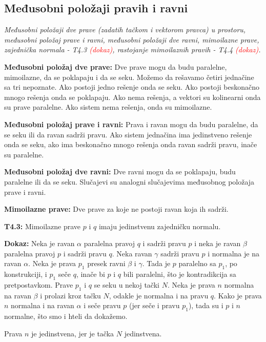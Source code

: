 \documentclass[12pt]{article}
\newcommand{\ocena}[1]{\textcolor{red}{#1}}
\begin{document}
\subsection{Međusobni položaji pravih i ravni}
\label{subsec:pitanje_16}
\textit{Međusobni položaji dve prave (zadatih tačkom i vektorom pravca) u
    prostoru, međusobni položaj prave i ravni, međusobni položaji dve ravni,
    mimoilazne prave, zajednička normala - T4.3 \ocena{(dokaz)}, rastojanje mimoilaznih
    pravih - T4.4 \ocena{(dokaz)}.}
\par
\vspace*{1cm}

\textbf{Međusobni položaj dve prave:} Dve prave mogu da budu paralelne,
mimoilazne, da se poklapaju i da se seku. Možemo da rešavamo četiri jednačine sa
tri nepoznate. Ako postoji jedno rešenje onda se seku. Ako postoji beskonačno
mnogo rešenja onda se poklapaju. Ako nema rešenja, a vektori su kolinearni onda
su prave paralelne. Ako sistem nema rešenja, onda su mimoilazne.
\par

\textbf{Međusobni položaj prave i ravni:} Prava i ravan mogu da budu paralelne,
da se seku ili da ravan sadrži pravu. Ako sistem jednačina ima jedinstveno
rešenje onda se seku, ako ima beskonačno mnogo rešenja onda ravan sadrži pravu,
inače su paralelne.
\par

\textbf{Međusobni položaj dve ravni:} Dve ravni mogu da se poklapaju, budu
paralelne ili da se seku. Slučajevi su analogni slučajevima međusobnog položaja
prave i ravni.
\par

\textbf{Mimoilazne prave:} Dve prave za koje ne postoji ravan koja ih sadrži.
\par

\textbf{T4.3:} Mimoilazne prave $p$ i $q$ imaju jedinstvenu zajedničku normalu.
\par
\textbf{Dokaz:} Neka je ravan $\alpha$ paralelna pravoj $q$ i sadrži pravu $p$ i
neka je ravan $\beta$ paralelna pravoj $p$ i sadrži pravu $q$. Neka ravan $\gamma$
sadrži pravu $p$ i normalna je na ravan $\alpha$.
Neka je prava $p_1$ presek ravni $\beta$ i $\gamma$. Tada je
$p$ paralelno sa $p_1$, po konstrukciji, i $p_1$ seče $q$, inače bi
$p$ i $q$ bili paralelni, što je kontradikcija sa pretpostavkom.
Prave $p_1$ i $q$ se seku u nekoj tački $N$. Neka je prava $n$ normalna
na ravan $\beta$ i prolazi kroz tačku $N$, odakle je normalna i na pravu
$q$. Kako je prava $n$ normalna i na ravan $\alpha$ i seče pravu $p$
(jer seče i pravu $p_1$), tada su i $p$ i $n$
normalne, što smo i hteli da dokažemo.\par
Prava $n$ je jedinstvena, jer je tačka $N$ jedinstvena.
\par
\end{document}

